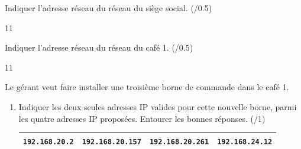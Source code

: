 \documentclass[a4paper,10pt]{report}
\begin{document}
\medskip

\begin{enumerate}
    \begin{minipage}{0.48\linewidth}
        \item Indiquer l'adresse réseau du réseau du siège social. (/0.5)
\end{minipage}\hfill
    \begin{minipage}{0.48\linewidth}
        \begin{answer}{1}{1}    \end{answer}
\end{minipage}

\begin{minipage}{0.48\linewidth}
    \item Indiquer l'adresse réseau du réseau du café 1. (/0.5)
\end{minipage}\hfill
    \begin{minipage}{0.48\linewidth}
        \begin{answer}{1}{1}    \end{answer}
\end{minipage}

\end{enumerate}

\medskip

Le gérant veut faire installer une troisième borne de commande dans le café 1.

\begin{enumerate}[resume]
    \item Indiquer les deux seules adresses IP valides pour cette nouvelle borne, parmi les quatre adresses IP proposées. Entourer les bonnes réponses. (/1)
    \begin{center}
        \begin{tabular}{|c|c|c|c|}
            \hline
            \verb|192.168.20.2| & \verb|192.168.20.157| & \verb|192.168.20.261| & \verb|192.168.24.12|
            \\
            \hline
        \end{tabular}
    \end{center}



\end{enumerate}
    \medskip
\end{document}
